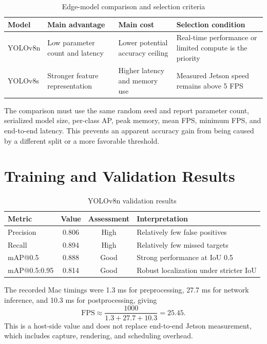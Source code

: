 \documentclass[a4paper,11pt]{article}
\begin{document}
\begin{table}[htbp]\centering\caption{Edge-model comparison and selection criteria}
\begin{tabularx}{0.9\textwidth}{lXXX}\toprule
\textbf{Model} & \textbf{Main advantage} & \textbf{Main cost} & \textbf{Selection condition}\\\midrule
YOLOv8n & Low parameter count and latency & Lower potential accuracy ceiling & Real-time performance or limited compute is the priority\\
YOLOv8s & Stronger feature representation & Higher latency and memory use & Measured Jetson speed remains above 5 FPS\\\bottomrule
\end{tabularx}\end{table}

The comparison must use the same random seed and report parameter count, serialized model size, per-class AP, peak memory, mean FPS, minimum FPS, and end-to-end latency. This prevents an apparent accuracy gain from being caused by a different split or a more favorable threshold.

\section{Training and Validation Results}
\begin{table}[htbp]\centering\caption{YOLOv8n validation results}\label{tab:metrics}
\begin{tabular}{lccl}\toprule \textbf{Metric} & \textbf{Value} & \textbf{Assessment} & \textbf{Interpretation}\\\midrule
Precision & 0.806 & High & Relatively few false positives\\
Recall & 0.894 & High & Relatively few missed targets\\
mAP@0.5 & 0.888 & Good & Strong performance at IoU 0.5\\
mAP@0.5:0.95 & 0.814 & Good & Robust localization under stricter IoU\\\bottomrule
\end{tabular}\end{table}

The recorded Mac timings were 1.3 ms for preprocessing, 27.7 ms for network inference, and 10.3 ms for postprocessing, giving
\begin{equation}\mathrm{FPS}\approx\frac{1000}{1.3+27.7+10.3}=25.45.\end{equation}
This is a host-side value and does not replace end-to-end Jetson measurement, which includes capture, rendering, and scheduling overhead.
\end{document}
